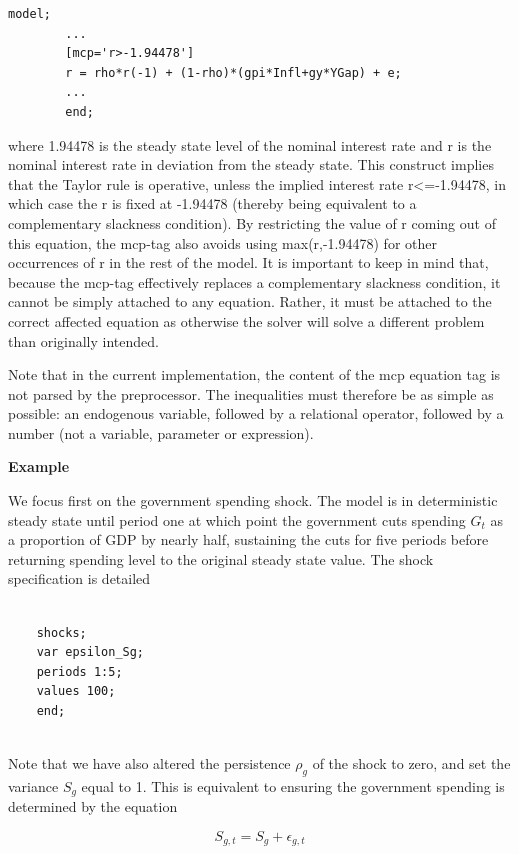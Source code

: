 \documentclass[10pt,math=newtx,citestyle=gb7714-2015,bibstyle=gb7714-2015]{elegantbook}
\begin{document}
{\begin{itemize}
	\begin{lstlisting}[frame=shadowbox]
		model;
		...
		[mcp='r>-1.94478']
		r = rho*r(-1) + (1-rho)*(gpi*Infl+gy*YGap) + e;
		...
		end;
	\end{lstlisting}
	
	where 1.94478 is the steady state level of the nominal interest rate and r is the nominal interest rate in deviation from the steady state. This construct implies that the Taylor rule is operative, unless the implied interest rate r<=-1.94478, in which case the r is fixed at -1.94478 (thereby being equivalent to a complementary slackness condition). By restricting the value of r coming out of this equation, the mcp-tag also avoids using max(r,-1.94478) for other occurrences of r in the rest of the model. It is important to keep in mind that, because the mcp-tag effectively replaces a complementary slackness condition, it cannot be simply attached to any equation. Rather, it must be attached to the correct affected equation as otherwise the solver will solve a different problem than originally intended.
	
	Note that in the current implementation, the content of the mcp equation tag is not parsed by the preprocessor. The inequalities must therefore be as simple as possible: an endogenous variable, followed by a relational operator, followed by a number (not a variable, parameter or expression).
	
\end{itemize}

\textbf{Example}

We focus first on the government spending shock. The model is in deterministic steady state until period one at which point the government cuts spending $G_t$ as a proportion of GDP by nearly half, sustaining the cuts for five periods before returning spending level to the original steady state value. The shock
specification is detailed

\begin{lstlisting}[frame=shadowbox]
	
	shocks;
	var epsilon_Sg;
	periods 1:5;
	values 100;
	end;
	
\end{lstlisting}

Note that we have also altered the persistence $\rho_g$ of the shock to zero, and set the variance $S_g$ equal to 1. This is
equivalent to ensuring the government spending is determined by the equation

$$S_{g,t}=S_g+\epsilon_{g,t}$$

}
\end{document}
